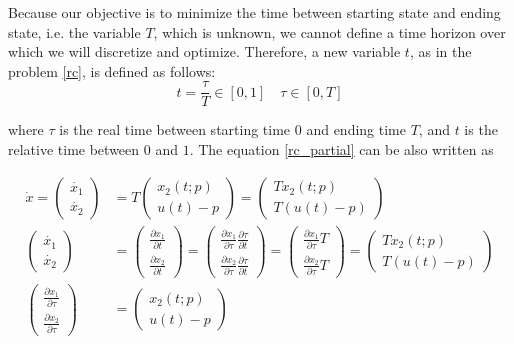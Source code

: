 \documentclass  [
  paper    = a4,
  BCOR     = 10mm,
  twoside,
  fontsize = 12pt,
  fleqn,
  toc      = bibnumbered,
  toc      = listofnumbered,
  numbers  = noendperiod,
  headings = normal,
  listof   = leveldown,
  version  = 3.03
]                                       {scrreprt}
\newcommand{\<}{\langle}
\renewcommand{\>}{\rangle}
\begin{document}
Because our objective is to minimize the time between starting state and ending state, i.e. the variable $T$, which is unknown, we cannot define a time horizon over which we will discretize and optimize. Therefore, a new variable $t$, as in the problem \ref{rc}, is defined as follows: 
\begin{equation}
	t= \frac{\tau}{T} \in [0,1] \quad \tau \in [0, T]
	\label{eqn:timet}
\end{equation}

where $\tau$ is the real time between starting time $0$ and ending time $T$, and $t$ is the relative time between $0$ and $1$.  The equation \ref{rc_partial} can be also written as 

\begin{subequations}
	\begin{align}
		\dot{x} =  \begin{pmatrix} \dot{x_1} \\ \dot{x_2} \end{pmatrix}  & =  T  \begin{pmatrix}  x_2(t;p) \\ u(t)-p   \end{pmatrix} = \begin{pmatrix}  Tx_2(t;p) \\ T(u(t)-p)   \end{pmatrix} \label{eq_difT} \\ 
		\begin{pmatrix} \dot{x_1} \\ \dot{x_2} \end{pmatrix} &= \begin{pmatrix} \frac{\partial x_1}{\partial t} \\ \frac{\partial x_2}{\partial t} \end{pmatrix} = \begin{pmatrix} \frac{\partial x_1}{\partial \tau} \frac{\partial \tau}{\partial t} \\ \frac{\partial x_2}{\partial \tau} \frac{\partial \tau}{\partial t} \end{pmatrix} =  \begin{pmatrix} \frac{\partial x_1}{\partial \tau} T \\ \frac{\partial x_2}{\partial \tau}T \end{pmatrix} =     \begin{pmatrix}  Tx_2(t;p) \\ T(u(t)-p)   \end{pmatrix} \\
		\begin{pmatrix} \frac{\partial x_1}{\partial \tau}  \\ \frac{\partial x_2}{\partial \tau} \end{pmatrix} & =     \begin{pmatrix}  x_2(t;p) \\ u(t)-p   \end{pmatrix} \label{eq_difTau}
	\end{align}
	\label{partialX}
\end{subequations}
\end{document}
